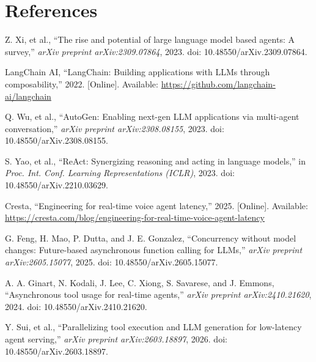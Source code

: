 \documentclass[numbered,mediumone,traditional]{oup-authoring-template}
\begin{document}
\section*{References}
\begingroup
\small
\begin{list}{}{%
  \setlength{\labelwidth}{2.6em}%
  \setlength{\labelsep}{0.5em}%
  \setlength{\leftmargin}{3.1em}%
  \setlength{\itemindent}{0pt}%
  \setlength{\topsep}{4pt}%
  \setlength{\itemsep}{2pt}}

\item[{[1]}] Z. Xi, et al., ``The rise and potential of large language model based agents: A survey,'' \textit{arXiv preprint arXiv:2309.07864}, 2023. doi: 10.48550/arXiv.2309.07864.

\item[{[2]}] LangChain AI, ``LangChain: Building applications with LLMs through composability,'' 2022. [Online]. Available: \url{https://github.com/langchain-ai/langchain}

\item[{[3]}] Q. Wu, et al., ``AutoGen: Enabling next-gen LLM applications via multi-agent conversation,'' \textit{arXiv preprint arXiv:2308.08155}, 2023. doi: 10.48550/arXiv.2308.08155.

\item[{[4]}] S. Yao, et al., ``ReAct: Synergizing reasoning and acting in language models,'' in \textit{Proc. Int. Conf. Learning Representations (ICLR)}, 2023. doi: 10.48550/arXiv.2210.03629.

\item[{[5]}] Cresta, ``Engineering for real-time voice agent latency,'' 2025. [Online]. Available: \url{https://cresta.com/blog/engineering-for-real-time-voice-agent-latency}

\item[{[6]}] G. Feng, H. Mao, P. Dutta, and J. E. Gonzalez, ``Concurrency without model changes: Future-based asynchronous function calling for LLMs,'' \textit{arXiv preprint arXiv:2605.15077}, 2025. doi: 10.48550/arXiv.2605.15077.

\item[{[7]}] A. A. Ginart, N. Kodali, J. Lee, C. Xiong, S. Savarese, and J. Emmons, ``Asynchronous tool usage for real-time agents,'' \textit{arXiv preprint arXiv:2410.21620}, 2024. doi: 10.48550/arXiv.2410.21620.

\item[{[8]}] Y. Sui, et al., ``Parallelizing tool execution and LLM generation for low-latency agent serving,'' \textit{arXiv preprint arXiv:2603.18897}, 2026. doi: 10.48550/arXiv.2603.18897.


\end{list}
\end{document}

